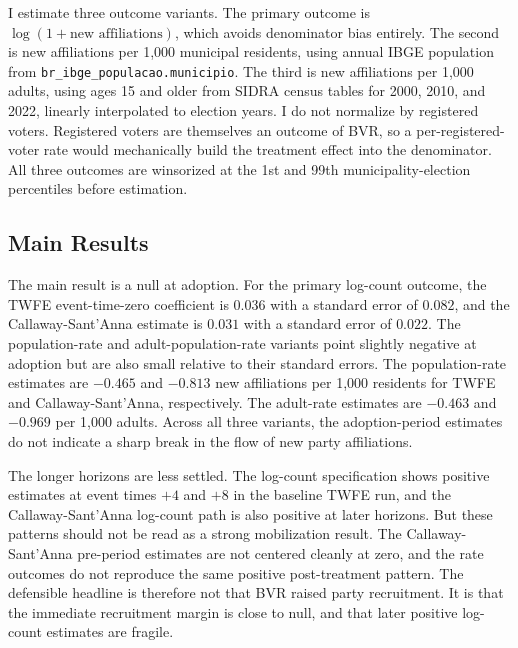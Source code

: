 I estimate three outcome variants. The primary outcome is $\log(1+\text{new affiliations})$, which avoids denominator bias entirely. The second is new affiliations per 1,000 municipal residents, using annual IBGE population from \texttt{br\_ibge\_populacao.municipio}. The third is new affiliations per 1,000 adults, using ages 15 and older from SIDRA census tables for 2000, 2010, and 2022, linearly interpolated to election years. I do not normalize by registered voters. Registered voters are themselves an outcome of BVR, so a per-registered-voter rate would mechanically build the treatment effect into the denominator. All three outcomes are winsorized at the 1st and 99th municipality-election percentiles before estimation.

\subsection{Main Results}



The main result is a null at adoption. For the primary log-count outcome, the TWFE event-time-zero coefficient is $0.036$ with a standard error of $0.082$, and the Callaway-Sant'Anna estimate is $0.031$ with a standard error of $0.022$. The population-rate and adult-population-rate variants point slightly negative at adoption but are also small relative to their standard errors. The population-rate estimates are $-0.465$ and $-0.813$ new affiliations per 1,000 residents for TWFE and Callaway-Sant'Anna, respectively. The adult-rate estimates are $-0.463$ and $-0.969$ per 1,000 adults. Across all three variants, the adoption-period estimates do not indicate a sharp break in the flow of new party affiliations.

The longer horizons are less settled. The log-count specification shows positive estimates at event times $+4$ and $+8$ in the baseline TWFE run, and the Callaway-Sant'Anna log-count path is also positive at later horizons. But these patterns should not be read as a strong mobilization result. The Callaway-Sant'Anna pre-period estimates are not centered cleanly at zero, and the rate outcomes do not reproduce the same positive post-treatment pattern. The defensible headline is therefore not that BVR raised party recruitment. It is that the immediate recruitment margin is close to null, and that later positive log-count estimates are fragile.

